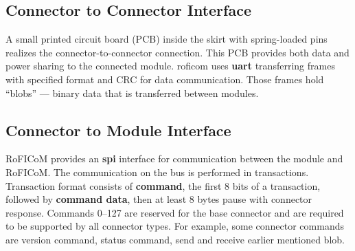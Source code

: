 \documentclass[
  digital,     %
  oneside,     %
  nosansbold,  %
  nocolorbold, %
  nolof,         %
  nolot,         %
]{fithesis4}
\newcommand{\TODO}[1]{\textcolor{red}{\textit{#1}}}
\begin{document}
\subsection{ Connector to Connector Interface }

A small printed circuit board (PCB) inside the skirt with spring-loaded pins realizes the connector-to-connector connection. This PCB provides both
data and power sharing to the connected module.
\acrshort{roficom} uses \textbf{\acrshort{uart}} transferring frames with specified format and CRC for data communication. Those frames hold ``blobs'' ---
binary data that is transferred between modules. 

\subsection{ Connector to Module Interface }
RoFICoM provides an \textbf{\acrshort{spi}} interface for communication between the module and RoFICoM. The communication on the bus is performed
in transactions. Transaction format consists of \textbf{command}, the first 8 bits of a transaction, followed by \textbf{command
data}, then at least 8 bytes pause with connector response. Commands \numrange{0}{127} are reserved for the base connector and are required to be supported by all
connector types. For example, some connector commands are version command, status command, send and receive earlier
mentioned blob.
\end{document}
